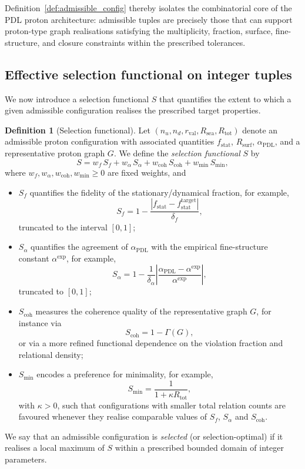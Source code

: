 \documentclass[11pt,a4paper]{article}
\theoremstyle{definition}
\newtheorem{definition}[theorem]{Definition}
\newcommand{\PDL}{\mathrm{PDL}}
\begin{document}
Definition~\ref{def:admissible_config} thereby isolates the combinatorial core of the PDL proton architecture: admissible tuples are precisely those that can support proton-type graph realisations satisfying the multiplicity, fraction, surface, fine-structure, and closure constraints within the prescribed tolerances.\cite{Combinatorial_Proton_v2_2026}

\subsection{Effective selection functional on integer tuples}

We now introduce a selection functional $S$ that quantifies the extent to which a given admissible configuration realises the prescribed target properties.

\begin{definition}[Selection functional]
\label{def:selection_functional}
Let $(n_u,n_d,r_{\mathrm{val}},R_{\mathrm{sea}},R_{\mathrm{tot}})$ denote an admissible proton configuration with associated quantities $f_{\mathrm{stat}}$, $R_{\mathrm{surf}}$, $\alpha_{\PDL}$, and a representative proton graph $G$. We define the \emph{selection functional} $S$ by
\[
 S = w_f\, S_f + w_{\alpha}\, S_{\alpha} + w_{\mathrm{coh}}\, S_{\mathrm{coh}} + w_{\mathrm{min}}\, S_{\mathrm{min}},
\]
where $w_f, w_{\alpha}, w_{\mathrm{coh}}, w_{\mathrm{min}}\geq 0$ are fixed weights, and
\begin{itemize}
  \item $S_f$ quantifies the fidelity of the stationary/dynamical fraction, for example,
  \[
   S_f = 1 - \frac{\left|f_{\mathrm{stat}} - f_{\mathrm{stat}}^{\mathrm{target}}\right|}{\delta_f},
  \]
  truncated to the interval $[0,1]$;
  \item $S_{\alpha}$ quantifies the agreement of $\alpha_{\PDL}$ with the empirical fine-structure constant $\alpha^{\mathrm{exp}}$, for example,
  \[
   S_{\alpha} = 1 - \frac{1}{\delta_{\alpha}}
   \left|\frac{\alpha_{\PDL} - \alpha^{\mathrm{exp}}}{\alpha^{\mathrm{exp}}}\right|,
  \]
  truncated to $[0,1]$;
  \item $S_{\mathrm{coh}}$ measures the coherence quality of the representative graph $G$, for instance via
  \[
   S_{\mathrm{coh}} = 1 - \Gamma(G),
  \]
  or via a more refined functional dependence on the violation fraction and relational density;\cite{PDL_Main_2026,PDL_Global_Mapping_2026}
  \item $S_{\mathrm{min}}$ encodes a preference for minimality, for example,
  \[
   S_{\mathrm{min}} = \frac{1}{1 + \kappa R_{\mathrm{tot}}},
  \]
  with $\kappa>0$, such that configurations with smaller total relation counts are favoured whenever they realise comparable values of $S_f$, $S_{\alpha}$ and $S_{\mathrm{coh}}$.\cite{Combinatorial_Proton_v2_2026}
\end{itemize}
We say that an admissible configuration is \emph{selected} (or selection-optimal) if it realises a local maximum of $S$ within a prescribed bounded domain of integer parameters.
\end{definition}
\end{document}
